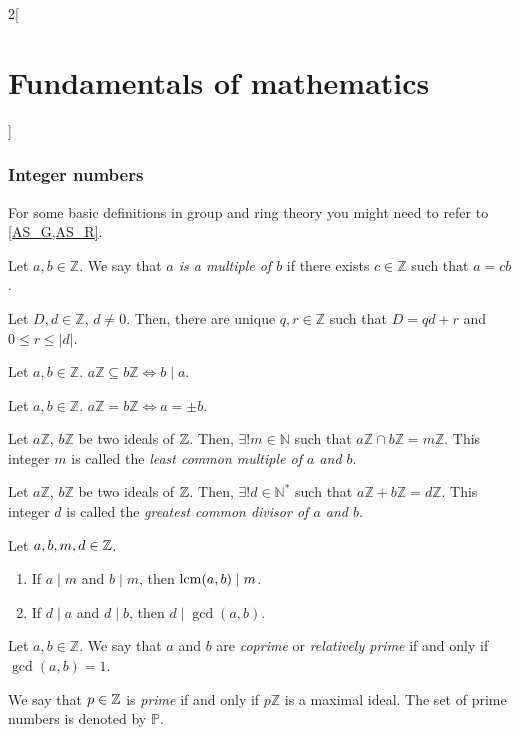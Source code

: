 \documentclass[../../../main.tex]{subfiles}
\begin{document}
\begin{multicols}{2}[\section{Fundamentals of mathematics}]
  \subsubsection{Integer numbers}
  For some basic definitions in group and ring theory you might need to refer to \cref{AS_G,AS_R}.
  \begin{definition}
    Let $a,b\in\mathbb{Z}$. We say that \textit{$a$ is a multiple of $b$} if there exists $c\in\mathbb{Z}$ such that $a=cb$.
  \end{definition}
  \begin{theorem}
    Let $D,d\in\mathbb{Z}$, $d\ne 0$. Then, there are unique $q,r\in\mathbb{Z}$ such that $D=qd+r$ and $0\leq r\leq|d|$.
  \end{theorem}
  \begin{prop}
    Let $a,b\in \mathbb{Z}$. $a\mathbb{Z}\subseteq b\mathbb{Z}\iff b\mid a$.
  \end{prop}
  \begin{corollary}
    Let $a,b\in \mathbb{Z}$. $a\mathbb{Z}=b\mathbb{Z}\iff a=\pm b$.
  \end{corollary}
  \begin{prop}
    Let $a\mathbb{Z}$, $b\mathbb{Z}$ be two ideals of $\mathbb{Z}$. Then, $\exists!m\in\mathbb{N}$ such that $a\mathbb{Z}\cap b\mathbb{Z}=m\mathbb{Z}$. This integer $m$ is called the \textit{least common multiple of $a$ and $b$}.
  \end{prop}
  \begin{prop}
    Let $a\mathbb{Z}$, $b\mathbb{Z}$ be two ideals of $\mathbb{Z}$. Then, $\exists!d\in\mathbb{N}^*$ such that $a\mathbb{Z}+b\mathbb{Z}=d\mathbb{Z}$. This integer $d$ is called the \textit{greatest common divisor of $a$ and $b$}.
  \end{prop}
  \begin{prop}
    Let $a,b,m,d\in\mathbb{Z}$.
    \begin{enumerate}
      \item If $a\mid m$ and $b\mid m$, then $\operatorname{lcm}(a,b)\mid m$.
      \item If $d\mid a$ and $d\mid b$, then $d\mid\gcd(a,b)$.
    \end{enumerate}
  \end{prop}
  \begin{definition}
    Let $a,b\in\mathbb{Z}$. We say that $a$ and $b$ are \textit{coprime} or \textit{relatively prime} if and only if $\gcd(a,b)=1$.
  \end{definition}
  \begin{definition}
    We say that $p\in\mathbb{Z}$ is \textit{prime} if and only if $p\mathbb{Z}$ is a maximal ideal. The set of prime numbers is denoted by $\mathbb{P}$.

\end{definition}
\end{multicols}
\end{document}

